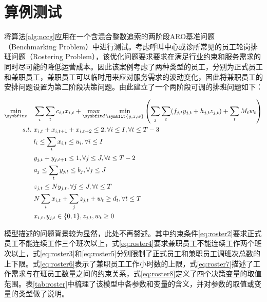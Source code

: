 \section{算例测试}

将算法\ref{alg:nccg}应用在一个含混合整数追索的两阶段ARO基准问题（Benchmarking Problem）中进行测试\cite{zhao2012}。考虑呼叫中心或诊所常见的员工轮岗排班问题（Rostering Problem），该优化问题要求要求在满足行业约束和服务需求的同时尽可能的降低运营成本。因此该案例考虑了两种类型的员工，分别为正式员工和兼职员工，兼职员工可以临时用来应对服务需求的波动变化，因此将兼职员工的安排问题设置为第二阶段决策问题。由此建立了一个两阶段可调的排班问题如下：

\begin{align}
  \min_{\symbfit x}\quad &\sum_i\sum_t c_{i,t}x_{i,t}+ \max_{\symbfit d}\min_{\symbfit{y,z,w}}\left(\sum_{j}\sum_t(f_{j,t}y_{j,t}+h_{j,t}z_{j,t})+\sum_tM_tw_t\right) \label{eq:roster1} \\
  s.t.\ & x_{i,t}+x_{i,t+1}+x_{i,t+2}\le 2, \forall i\le I, \forall t\le T-3 \label{eq:roster2}\\
  & l_i\le\sum_{t}x_{i,t}\le u_i, \forall i\le I \label{eq:roster3}\\
  & y_{j,t} + y_{j,t+1} \le 1, \forall j\le J, \forall t\le T-2 \label{eq:roster4}\\
  & a_j\le\sum_{t}y_{j,t}\le b_j, \forall j\le J \label{eq:roster5} \\
  & z_{j,t} \le Ny_{j,t}, \forall j\le J, \forall t\le T \label{eq:roster6} \\
  & N\sum_ix_{i,t}+\sum_{j}z_{j,t}+w_t\ge d_t, \forall t\le T \label{eq:roster7} \\
  & x_{i,t}, y_{j,t}\in\{0,1\}, z_{j,t}, w_t\ge0 \label{eq:roster8}
\end{align}

模型描述的问题背景较为显然，此处不再赘述。其中约束条件\eqref{eq:roster2}要求正式员工不能连续工作三个班次以上，式\eqref{eq:roster4}要求兼职员工不能连续工作两个班次以上，式\eqref{eq:roster3}和\eqref{eq:roster5}分别限制了正式员工和兼职员工调班次总数的上下限。式\eqref{eq:roster6}表示了兼职员工工作小时数的上限，式\eqref{eq:roster7}描述了工作需求与在班员工数量之间的约束关系，式\eqref{eq:roster8}定义了四个决策变量的取值范围。表\ref{tab:roster}中梳理了该模型中各参数和变量的含义，并对参数的取值或变量的类型做了说明。

